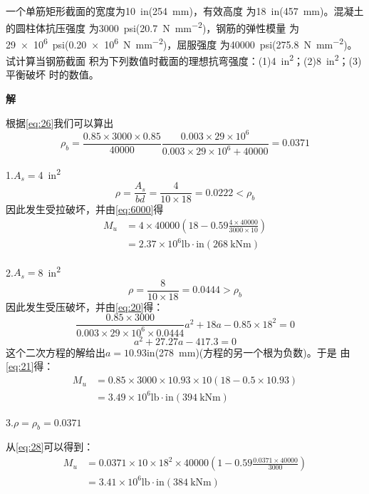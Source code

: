 \documentclass[12pt,a4paper]{book}
\begin{document}
\begin{example}
  一个单筋矩形截面的宽度为\SI{10}{in}(\SI{254}{mm})，有效高度
  为\SI{18}{in}(\SI{457}{mm})。混凝土的圆柱体抗压强度
  为\SI{3000}{psi}(\SI{20.7}{\newton\per\square\milli\meter})，钢筋的弹性模量
  为\SI{29e6}{psi}(\SI{0.20e6}{\newton\per\square\milli\meter})，屈服强度
  为\SI{40000}{psi}(\SI{275.8}{\newton\per\square\milli\meter})。试计算当钢筋截面
  积为下列数值时截面的理想抗弯强度：(1)\SI{4}{in^2}；(2)\SI{8}{in^2}；(3)平衡破坏
  时的数值。
\end{example}

\textbf{解}

根据\cref{eq:26}我们可以算出
\begin{equation*}
  \rho_b=\frac{0.85\times3000\times0.85}{40000}\frac{0.003\times29\times10^6}{0.003\times29\times10^6+40000}=0.0371
\end{equation*}

1.\quad $A_s=$\SI{4}{in^2}
\begin{equation*}
  \rho=\frac{A_s}{bd}=\frac{4}{10\times18}=0.0222<\rho_b
\end{equation*}
因此发生受拉破坏，并由\cref{eq:6000}得
\begin{align*}
    M_u &= 4\times40000
    \left(18-0.59\frac{4\times40000}{3000\times10}    \right)\\
        &= 2.37\times10^6\mathrm{lb\cdot in}(\SI{268}{\kilo\newton\meter})
\end{align*}

2.\quad $A_s=$\SI{8}{in^2}
\begin{equation*}
  \rho=\frac{8}{10\times18}=0.0444>\rho_b
\end{equation*}
因此发生受压破坏，并由\cref{eq:20}得：
\begin{equation*}
  \frac{0.85\times3000}{0.003\times29\times10^6\times0.0444}a^2+18a-0.85\times18^2=0
\end{equation*}
\begin{equation*}
  a^2+27.27a-417.3=0
\end{equation*}
这个二次方程的解给出$a=10.93$in(\SI{278}{mm})(方程的另一个根为负数)。于是
由\cref{eq:21}得：
\begin{align*}
  M_u &= 0.85\times3000\times10.93\times10(18-0.5\times10.93)\\
  &= 3.49\times10^6\mathrm{lb\cdot in}(\SI{394}{\kilo\newton\meter})
\end{align*}

3.\quad $\rho=\rho_b=0.0371$

从\cref{eq:28}可以得到：
\begin{align*}
  M_u &=0.0371\times10\times18^2\times40000
  \left(
1-0.59\frac{0.0371\times40000}{3000}
  \right)\\
&=3.41\times10^6\mathrm{lb\cdot in}(\SI{384}{\kilo\newton\meter})
\end{align*}
\end{document}
